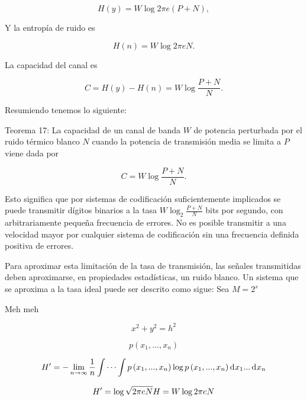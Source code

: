 	\begin{equation}
		H(y) = W\log 2\pi e(P+N),
	\end{equation}
	
	Y la entrop\'ia de ruido es
	
	\begin{equation}
		H(n) = W\log 2\pi eN.
	\end{equation}
	
	La capacidad del canal es
	
	\begin{equation}
		C = H(y) - H(n) = W\log \frac{P + N}{N}.
	\end{equation}
	
	Resumiendo tenemos lo siguiente:
	
	Teorema 17: La capacidad de un canal de banda $W$ de potencia perturbada por el ruido
	t\'ermico blanco $N$ cuando la potencia de transmisi\'on media se limita a $P$ viene
	dada por
	
	\begin{equation}
		C = W\log \frac{P + N}{N}.
	\end{equation}
	
	Esto significa que por sistemas de codificaci\'on suficientemente implicados se puede
	transmitir d\'igitos binarios a la tasa $W \log_{2}\frac{P + N}{N}$ bits por segundo,
	con arbitrariamente peque\~na frecuencia de errores. No es posible transmitir a una
	velocidad mayor por cualquier sistema de codificaci\'on sin una frecuencia
	definida positiva de errores.
	
	Para aproximar esta limitaci\'on de la tasa de transmisi\'on, las se\~nales transmitidas
	deben aproximarse, en propiedades estad\'isticas, un ruido blanco. Un sistema que se 
	aproxima a la tasa ideal puede ser descrito como sigue: Sea $M = 2^s$
	
	Meh meh
	
	\begin{displaymath}
		x^{2}+y^{2}=h^2
	\end{displaymath}

	\begin{equation}
		p\left ( x_{1},...,x_{n}\right )
	\end{equation}

	\begin{equation}
		{H}'=-\lim_{n\rightarrow \infty }\frac{1}{n}\int \cdots \int p\left ( 							x_{1},...,x_{n}\right ) \log p\left ( x_{1},...,x_{n}\right ) \diff x_{1}... \diff x_{n}
	\end{equation}

	\begin{equation}
		{H}'=\log \sqrt{2\pi eN}
		\newline
		H=W\log 2\pi eN
	\end{equation}		
	



